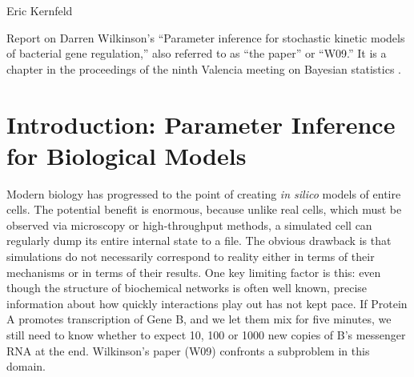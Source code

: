 \documentclass{article}
\newcommand\EMK[1]{\textcolor{purple}{EMK: #1}}
\begin{document}
Eric Kernfeld

Report on Darren Wilkinson's ``Parameter inference for stochastic kinetic models of bacterial gene regulation,'' also referred to as ``the paper'' or ``W09.'' It is a chapter in the proceedings of the ninth Valencia meeting on Bayesian statistics \cite{Bernardo2012}. 

\begin{abstract}
In this paper, Wilkinson attempts to infer reaction rates for biochemical networks in a setting with discrete observations, missing data, and measurement error. He uses vague priors and likelihood-free MCMC methods within a Bayesian model. He runs four main simulations. The first three iterate through successively more difficult and realistic measurement models, and they show the approach can accurately infer three key reaction rates with a useful precision. The fourth studies a naive model, showing it leads to overconfident, incorrect inferences. 

I review some alternative methods in detail and discuss the relative merits of W09's approach. I implement the method in Julia and attempt to reproduce the experiments \EMK{more on this later!}. I assess the method using additional experiments designed to study mixing time, scaling with system size, and prior sensitivity \EMK{more on this later!}. 
\end{abstract}


\section{Introduction: Parameter Inference for Biological Models}

Modern biology has progressed to the point of creating {\it in silico} models of entire cells. The potential benefit is enormous, because unlike real cells, which must be observed via microscopy or high-throughput methods, a simulated cell can regularly dump its entire internal state to a file. The obvious drawback is that simulations do not necessarily correspond to reality either in terms of their mechanisms or in terms of their results. One key limiting factor is this: even though the structure of biochemical networks is often well known, precise information about how quickly interactions play out has not kept pace. If Protein A promotes transcription of Gene B, and we let them mix for five minutes, we still need to know whether to expect 10, 100 or 1000 new copies of B's messenger RNA at the end. Wilkinson's paper (W09) confronts a subproblem in this domain.
\end{document}
